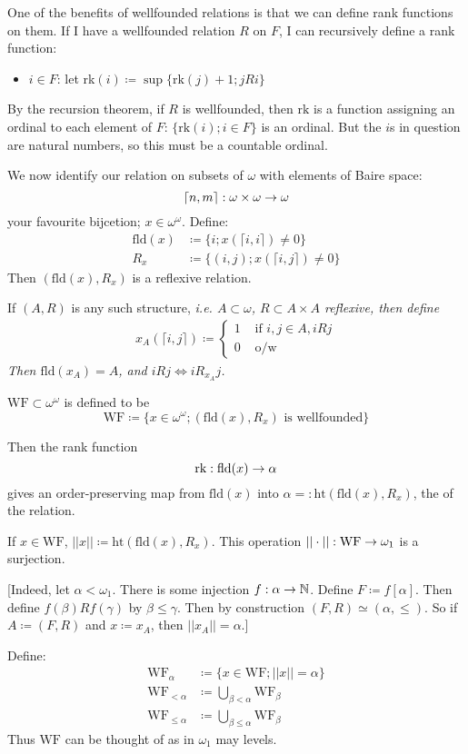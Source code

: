 \documentclass[]{article}
\newcommand{\om}{\omega}
\newcommand{\rk}{\textrm{rk}}
\newcommand{\fld}{\textrm{fld}}
\newcommand{\wf}{\textrm{WF}}
\newcommand{\hit}{\textrm{ht}}
\begin{document}
One of the benefits of wellfounded relations is that we can define rank functions on them. If I have a wellfounded relation $R$ on $F$, I can recursively define a rank function:
\begin{itemize}
    \item $i\in F$: let rk$(i)\coloneqq \sup \{\rk(j)+1;jRi\}$
\end{itemize}
By the recursion theorem, if $R$ is wellfounded, then $\rk$ is a function assigning an ordinal to each element of $F$: $\{\rk(i);i\in F\}$ is an ordinal. But the $i$s in question are natural numbers, so this must be a countable ordinal.

We now identify our relation on subsets of $\om$ with elements of Baire space:
$$ \lceil n,m\rceil :\om\times\om\ra\om$$
your favourite bijcetion; $x \in \om^\om$. Define:
\begin{align*}
    \fld(x)&\coloneqq \{i;x(\lceil i,i\rceil) \ne 0\}\\
    R_x &\coloneqq \{(i,j); x(\lceil i,j\rceil)\ne 0\}
\end{align*}
Then $(\fld(x),R_x)$ is a reflexive relation.

If $(A,R)$ is any such structure, \it{i.e.} $A\subset \om$, $R\subset A\times A$ reflexive, then define
\begin{align*}
    x_A(\lceil i,j\rceil)\coloneqq \left\lbrace \begin{array}{cc} 1 & \textrm{ if }i,j\in A,iRj\\ 0 & \textrm{ o/w}\end{array}\right.
\end{align*}
Then $\fld(x_A) = A$, and $iRj\iff iR_{x_A}j$.


 \begin{defin*}
     $\wf\subset\om^\om$ is defined to be $$\wf \coloneqq \{x \in \om^\om ; (\fld(x),R_x)\textrm{ is wellfounded}\}$$

     Then the rank function $$\rk : \fld(x) \ra \alpha$$ gives an order-preserving map from $\fld(x)$ into $\alpha =: \hit(\fld(x),R_x)$, the  of the relation.

     If $x \in \wf$, $||x|| \coloneqq \hit(\fld(x),R_x)$. This operation $||\cdot || : \wf \ra \omega_1$ is a surjection.

     [Indeed, let $\alpha < \omega_1$. There is some injection $f : \alpha \rightarrow \mathbb{N}$. Define $F\coloneqq f[\alpha]$. Then define $f(\beta) R f(\gamma)$ by $\beta\le \gamma$. Then by construction $(F,R)\simeq (\alpha,\le)$. So if $A\coloneqq (F,R)$ and $x \coloneqq x_A$, then $||x_A|| = \alpha$.]

     Define:
     \begin{align*}
         \wf_\alpha &\coloneqq \{x \in \wf; ||x|| = \alpha \}\\
         \wf_{<\alpha} &\coloneqq \bigcup_{\beta<\alpha}\wf_\beta\\
         \wf_{\le \alpha} &\coloneqq \bigcup_{\beta\le\alpha}\wf_\beta
     \end{align*}
     Thus $\wf$ can be thought of as  in $\om_1$ may levels.
 \end{defin*}
\end{document}
